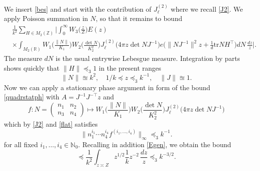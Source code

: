 \documentclass[11pt]{amsart}
\numberwithin{equation}{section}
\theoremstyle{plain}
\theoremstyle{definition}
\numberwithin{equation}{section}
\begin{document}
We insert \eqref{bes} and start with the contribution of $J_{\ell}^{(2)}$ where we recall  \eqref{J2}. We apply Poisson summation in $N$, so that it remains to bound%
\begin{align}
&\frac{1}{k^2} \sum_{H \in M_2(\mathbb{Z})}  \Big|   \int_0^{\infty} W_3\Big(\frac{z}{Z}\Big)E(z) \\
   & \times \int_{M_2(\mathbb{R})} W_1\Big(\frac{\| N \|}{K_1}\Big) W_2\Big(\frac{\det N}{K_2^2}\Big) J^{(2)}_{\ell}\big(4\pi z  \det NJ^{-1} \big) e\Big(\| N J^{-1}\|^2 z +\frac{1}{d}\text{tr} N H^{\top}\Big) dN \,  \frac{dz}{z}\Big| . 
\end{align}
The measure $dN$ is the usual entrywise Lebesgue measure. Integration by parts shows quickly that $\| H \| \preccurlyeq_{3} 1$ in the present ranges $$\| N \|\approxeq k^{2}, \quad 1/k \preccurlyeq z \preccurlyeq_{3} k^{-1 }, \quad \| J \| \approxeq 1.$$ Now we can apply a   stationary phase argument in form of the bound \eqref{quadrstatph} with $A = J^{-1} J^{-\top} z$ and 
$$f :  N = \left(\begin{matrix} n_1 & n_2 \\ n_3 & n_4\end{matrix}\right)\mapsto W_1\Big(\frac{\| N \|}{K_1}\Big) W_2\Big(\frac{\det N}{K_2^2}\Big) J^{(2)}_{\ell}\big(4\pi z  \det NJ^{-1} \big)$$
which by \eqref{J2} and \eqref{flat} satisfies
$$ \| n_1^{i_1} \cdots n_4^{i_4} f^{(i_1, \ldots, i_4)} \|_{\infty} \preccurlyeq_{3} k^{-1}.$$
  for all fixed $i_1, \ldots, i_4 \in \mathbb{N}_0$. Recalling in addition \eqref{Egen}, we obtain   the bound
\begin{equation}\label{2a}
\preccurlyeq \frac{1}{k^2}  \int_{z \asymp Z} z^{1/2}  \frac{1}{k} z^{-2} \, \frac{dz}{z} \preccurlyeq_{3} k^{-3/2}.
\end{equation}
\end{document}
